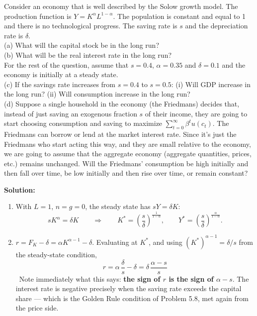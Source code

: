 \documentclass[12pt, letterpaper]{article}
\newcommand{\stst}{^{\ast}}
\begin{document}
\begin{tcolorbox}[oddbox,title={Problem 6.7 \quad One Rational Household}]
\begin{tcolorbox}[questionbox]
Consider an economy that is well described by the Solow growth model. The production
function is $Y=K^{\alpha}L^{1-\alpha}$. The population is constant and equal to 1 and there
is no technological progress. The saving rate is $s$ and the depreciation rate is
$\delta$.\\[3pt]
(a) What will the capital stock be in the long run?\\[3pt]
(b) What will be the real interest rate in the long run?\\[3pt]
For the rest of the question, assume that $s=0.4$, $\alpha=0.35$ and $\delta=0.1$ and the
economy is initially at a steady state.\\[3pt]
(c) If the savings rate increases from $s=0.4$ to $s=0.5$: (i) Will GDP increase in the long
run? (ii) Will consumption increase in the long run?\\[3pt]
(d) Suppose a single household in the economy (the Friedmans) decides that, instead of just
saving an exogenous fraction $s$ of their income, they are going to start choosing
consumption and saving to maximize $\sum_{t=0}^{\infty}\beta^{t}u(c_t)$. The Friedmans can
borrow or lend at the market interest rate. Since it's just the Friedmans who start acting
this way, and they are small relative to the economy, we are going to assume that the
aggregate economy (aggregate quantities, prices, etc.) remains unchanged. Will the
Friedmans' consumption be high initially and then fall over time, be low initially and then
rise over time, or remain constant?
\end{tcolorbox}

\textbf{Solution:}
\begin{enumerate}

\item With $L=1$, $n=g=0$, the steady state has $sY=\delta K$:
\[
sK^{\alpha}=\delta K
\qquad\Longrightarrow\qquad
\boxed{K\stst=\left(\frac{s}{\delta}\right)^{\frac{1}{1-\alpha}}},
\qquad
Y\stst=\left(\frac{s}{\delta}\right)^{\frac{\alpha}{1-\alpha}} .
\]

\item $r=F_K-\delta=\alpha K^{\alpha-1}-\delta$. Evaluating at $K\stst$, and using
$(K\stst)^{\alpha-1}=\delta/s$ from the steady-state condition,
\[
\boxed{\;r=\alpha\,\frac{\delta}{s}-\delta=\delta\,\frac{\alpha-s}{s}\;}
\]
\checkmark\ Note immediately what this says: \textbf{the sign of $r$ is the sign of
$\alpha-s$}. The interest rate is negative precisely when the saving rate exceeds the capital
share --- which is the Golden Rule condition of Problem 5.8, met again from the price side.


\end{enumerate}
\end{tcolorbox}
\end{document}
